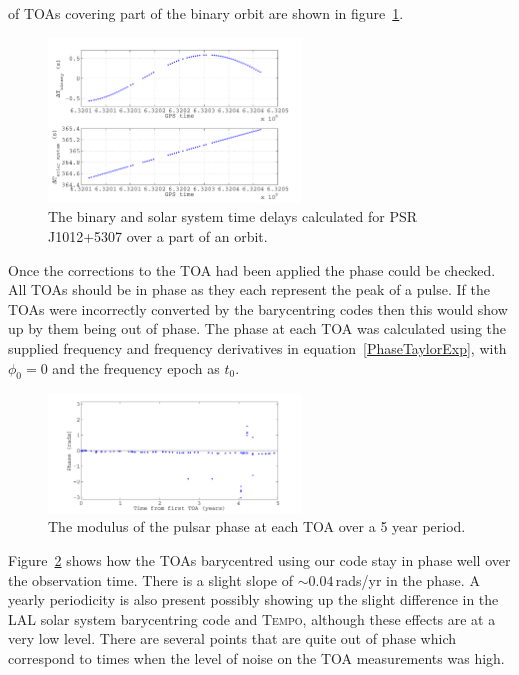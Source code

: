 of TOAs covering part of the binary orbit are shown in figure~\ref{J1012+5307DT}.
\begin{figure}[!htbp]
\begin{center}
\includegraphics[width=0.6\textwidth]{figs/J1012+5307DT}
\caption[The binary and solar system time delays for PSR\,J1012+5307.]{The binary and solar system
time delays calculated for PSR\,J1012+5307 over a part of an orbit.}\label{J1012+5307DT}
\end{center}
\end{figure}
Once the corrections to the TOA had been applied the phase could be checked. All TOAs should be in
phase as they each represent the peak of a pulse. If the TOAs were incorrectly converted by the
barycentring codes then this would show up by them being out of phase. The phase at each TOA was
calculated using the supplied frequency and frequency derivatives in equation~\ref{PhaseTaylorExp},
with $\phi_0 = 0$ and the frequency epoch as $t_0$.
\begin{figure}[!htbp]
\begin{center}
\includegraphics[width=0.6\textwidth]{figs/J1012+5307Phase}
\caption{The modulus of the pulsar phase at each TOA over a 5 year period.}\label{J1012+5307Phase}
\end{center}
\end{figure}
Figure~\ref{J1012+5307Phase} shows how the TOAs barycentred using our code stay in phase well over
the observation time. There is a slight slope of $\sim 0.04$\,rads/yr in the phase. A yearly
periodicity is also present possibly showing up the slight difference in the LAL solar
system barycentring code and T\textsc{empo}, although these effects are at a very low level. There
are several points that are quite out of phase which correspond to times when the level of noise on
the TOA measurements was high.

